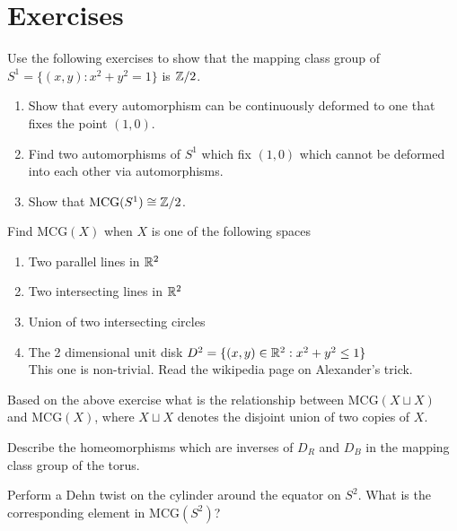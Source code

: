 \section{Exercises}
\begin{exercise}
	Use the following exercises to show that the mapping class group of $S^1 = \{ (x,y): x^2 + y^2 = 1\}$ is $\mathbb{Z}/2$.
	\begin{enumerate}
		\item Show that every automorphism can be continuously deformed to one that fixes the point $(1,0)$.
		\item Find two automorphisms of $S^1$ which fix $(1,0)$ which cannot be deformed into each other via automorphisms.
		\item Show that $\mathrm{MCG}(S^1) \cong \mathbb{Z}/2$.
	\end{enumerate}
\end{exercise}

\begin{exercise}
	Find $\mathrm{MCG}(X)$ when $X$ is one of the following spaces
	\begin{enumerate}
		\item Two parallel lines in $\mathbb{R}^2$
		\item Two intersecting lines in $\mathbb{R}^2$
		\item Union of two intersecting circles
		\item The 2 dimensional unit disk $D^2 = \{ (x,y) \in \mathbb{R}^2 : x^2 + y^2 \le 1\}$ \\ This one is non-trivial. Read the wikipedia page on Alexander's trick.
	\end{enumerate}
\end{exercise}

\begin{exercise}
	Based on the above exercise what is the relationship between $\mathrm{MCG}(X \sqcup X)$ and $\mathrm{MCG}(X)$, where $X \sqcup X$ denotes the disjoint union of two copies of $X$.
\end{exercise}

\begin{exercise}
	Describe the homeomorphisms which are inverses of $D_R$ and $D_B$ in the mapping class group of the torus.
\end{exercise}

\begin{exercise}
	Perform a Dehn twist on the cylinder around the equator on $S^2$. What is the corresponding element in $\mathrm{MCG}(S^2)$?
\end{exercise}

